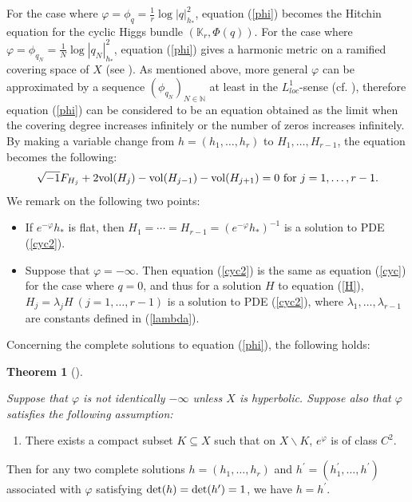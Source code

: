 \documentclass[12pt]{article}
\theoremstyle{definition}
\newtheorem{theo}[defi]{Theorem}
\def\det{{\rm det}}
\def\det{{\rm det}}
\def\refe{\ast}
\def\vol{{\rm vol}}
\def\N{{\mathbb N}}
\def\K{{\mathbb K}}
\def\inum{{\sqrt{-1}}}
\begin{document}
For the case where $\varphi=\phi_q=\frac{1}{r}\log|q|_{h_\refe}^2$, equation (\ref{phi}) becomes the Hitchin equation for the cyclic Higgs bundle $(\K_r,\Phi(q))$. For the case where $\varphi=\phi_{q_N}=\frac{1}{N}\log|q_N|_{h_\refe}^2$, equation (\ref{phi}) gives a harmonic metric on a ramified covering space of $X$ (see \cite[Section 2]{Miy2}). As mentioned above, more general $\varphi$ can be approximated by a sequence $(\phi_{q_N})_{N\in\N}$ at least in the $L^1_{loc}$-sense (cf. \cite{GZ1}), therefore equation (\ref{phi}) can be considered to be an equation obtained as the limit when the covering degree increases infinitely or the number of zeros increases infinitely. By making a variable change from $h=(h_1,\dots, h_r)$ to $H_1,\dots, H_{r-1}$, the equation becomes the following:
\begin{align}
\inum F_{H_j} + 2\vol(H_j) - \vol(H_{j-1}) - \vol(H_{j+1}) = 0 \ \text{for $j=1,\dots, r-1$.}\label{cyc2}
\end{align}
We remark on the following two points:
\begin{itemize}
\item If $e^{-\varphi}h_\refe$ is flat, then $H_1=\cdots=H_{r-1}=(e^{-\varphi}h_\refe)^{-1}$ is a solution to PDE (\ref{cyc2}).
\item Suppose that $\varphi=-\infty$. Then equation (\ref{cyc2}) is the same as equation (\ref{cyc}) for the case where $q=0$, and thus for a solution $H$ to equation (\ref{H}), $H_j=\lambda_j H\ (j=1,\dots, r-1)$ is a solution to PDE (\ref{cyc2}), where $\lambda_1,\dots, \lambda_{r-1}$ are constants defined in (\ref{lambda}).
\end{itemize}
Concerning the complete solutions to equation (\ref{phi}), the following holds:
\begin{theo}[\cite{Miy5}]\label{c1} {\it Suppose that $\varphi$ is not identically $-\infty$ unless $X$ is hyperbolic. Suppose also that $\varphi$ satisfies the following assumption:
\begin{enumerate}[$(\ast)$]
\item There exists a compact subset $K\subseteq X$ such that on $X\backslash K$, $e^{\varphi}$ is of class $C^2$.
\end{enumerate}
Then for any two complete solutions $h=(h_1,\dots, h_r)$ and $h^\prime=(h_1^\prime,\dots, h^\prime)$ associated with $\varphi$ satisfying $\det(h)=\det(h^\prime)=1$, we have $h=h^\prime$. 
}
\end{theo}
\end{document}
